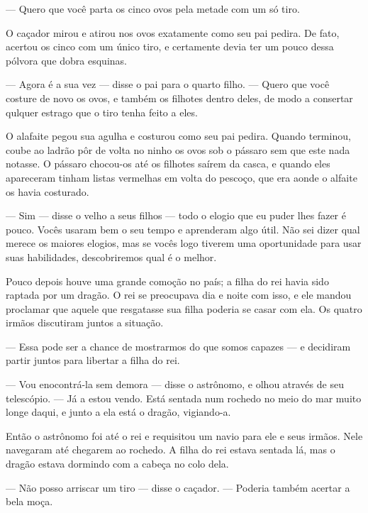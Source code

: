 — Quero que você parta os cinco ovos pela metade com um só tiro.

O caçador mirou e atirou nos ovos exatamente como seu pai pedira. De
fato, acertou os cinco com um único tiro, e certamente devia ter um
pouco dessa pólvora que dobra esquinas. 

— Agora é a sua vez — disse o pai para o quarto filho. — Quero que
você costure de novo os ovos, e também os filhotes dentro deles, de
modo a consertar qulquer estrago que o tiro tenha feito a eles.

O alafaite pegou sua agulha e costurou como seu pai pedira. Quando
terminou, coube ao ladrão pôr de volta no ninho os ovos sob o pássaro
sem que este nada notasse. O pássaro chocou-os até os filhotes saírem
da casca, e quando eles apareceram tinham listas vermelhas em volta
do pescoço, que era aonde o alfaite os havia costurado.

— Sim — disse o velho a seus filhos — todo o elogio que eu puder lhes
fazer é pouco. Vocês usaram bem o seu tempo e aprenderam algo útil.
Não sei dizer qual merece os maiores elogios, mas se vocês logo
tiverem uma oportunidade para usar suas habilidades, descobriremos
qual é o melhor.

Pouco depois houve uma grande comoção no país; a filha do rei havia
sido raptada por um dragão. O rei se preocupava dia e noite com isso,
e ele mandou proclamar que aquele que resgatasse sua filha poderia se
casar com ela. Os quatro irmãos discutiram juntos a situação.

— Essa pode ser a chance de mostrarmos do que somos capazes — e
decidiram partir juntos para libertar a filha do rei.

— Vou enocontrá-la sem demora — disse o astrônomo, e olhou através de
seu telescópio. — Já a estou vendo. Está sentada num rochedo no meio
do mar muito longe daqui, e junto a ela está o dragão, vigiando-a. 

Então o astrônomo foi até o rei e requisitou um navio para ele e seus
irmãos. Nele navegaram até chegarem ao rochedo. A filha do rei estava
sentada lá, mas o dragão estava dormindo com a cabeça no colo dela.

— Não posso arriscar um tiro — disse o caçador. — Poderia também
acertar a bela moça. 

